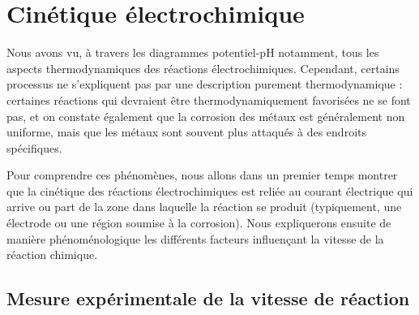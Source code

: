 \documentclass[11pt,fleqn]{book} %
\begin{document}










\setcounter{chapter}{14}

\chapter{Cinétique électrochimique}

Nous avons vu, à travers les diagrammes potentiel-pH notamment, tous les aspects thermodynamiques des réactions électrochimiques. Cependant, certains processus ne s'expliquent pas par une description purement thermodynamique : certaines réactions qui devraient être thermodynamiquement favorisées ne se font pas, et on constate également que la corrosion des métaux est généralement non uniforme, mais que les métaux sont souvent plus attaqués à des endroits spécifiques.

Pour comprendre ces phénomènes, nous allons dans un premier temps montrer que la cinétique des réactions électrochimiques est reliée au courant électrique qui arrive ou part de la zone dans laquelle la réaction se produit (typiquement, une électrode ou une région soumise à la corrosion). Nous expliquerons ensuite de manière phénoménologique les différents facteurs influençant la vitesse de la réaction chimique.

\section{Mesure expérimentale de la vitesse de réaction}
\end{document}

